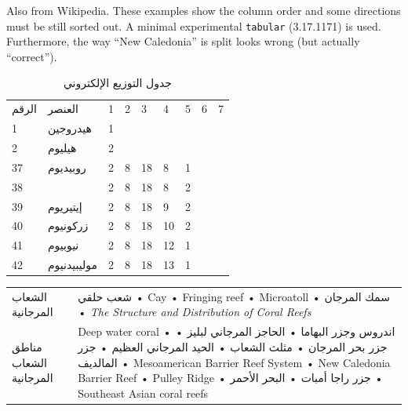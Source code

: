 \documentclass[a4paper]{book}
\begin{document}
\foreignlanguage*{english}{Also from Wikipedia. These examples show
the column order and some directions must be still sorted out. A
minimal experimental \texttt{tabular} (3.17.1171) is
used. Furthermore, the way “New Caledonia” is split looks wrong (but
actually “correct”).}

\begin{table}
\centering
\caption{جدول التوزيع الإلكتروني}
\begin{tabular}{lllllllll}
\toprule
\multicolumn{1}{c}{الرقم} &  العنصر & 1 & 2 & 3 & 4 & 5 & 6 & 7\\
\cmidrule(r){1-2}\cmidrule(r){3-9}
1 & هيدروجين & 1\\
2 & هيليوم & 2\\
37 & روبيديوم & 2 & 8 & 18 & 8 & 1\\
38 & \color{red}{سترانشيوم} & 2 & 8 & 18 & 8 & 2\\
39 & إيتيريوم & 2 & 8 & 18 & 9 & 2\\
40 & زركونيوم & 2 & 8 & 18 & 10 & 2\\
41 & نيوبيوم & 2 & 8 & 18 & 12 & 1\\
42 & موليبيدنيوم & 2 & 8 & 18 & 13 & 1\\
\bottomrule
\end{tabular}
\end{table}

\begin{center}
\begin{tabular}{lp{8cm}}
  \toprule
  الشعاب المرجانية
  & شعب حلقي • Cay • Fringing reef • Microatoll •
    سمك المرجان • \foreignlanguage{english}{\textit{The Structure and
    Distribution of Coral Reefs}}\\[1ex]
  مناطق الشعاب  المرجانية
  & Deep water coral • اندروس وجزر البهاما • الحاجز المرجاني لبليز •
    جزر بحر المرجان • مثلث الشعاب • الحيد المرجاني العظيم • جزر المالديف •
    Mesoamerican Barrier Reef System • New Caledonia Barrier Reef • Pulley
    Ridge • جزر راجا أمبات • البحر الأحمر • Southeast Asian coral reefs\\
  \bottomrule
\end{tabular}
\end{center}
\end{document}
